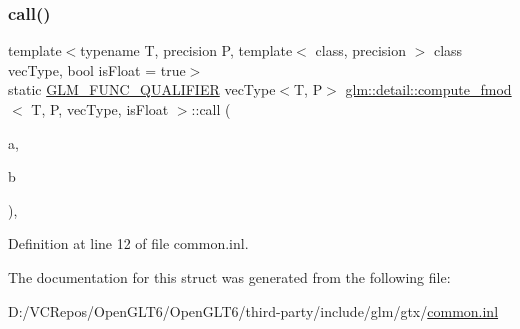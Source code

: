 \subsubsection{\texorpdfstring{call()}{call()}}
{\footnotesize\ttfamily template$<$typename T, precision P, template$<$ class, precision $>$ class vec\+Type, bool is\+Float = true$>$ \\
static \mbox{\hyperlink{setup_8hpp_a33fdea6f91c5f834105f7415e2a64407}{G\+L\+M\+\_\+\+F\+U\+N\+C\+\_\+\+Q\+U\+A\+L\+I\+F\+I\+ER}} vec\+Type$<$T, P$>$ \mbox{\hyperlink{structglm_1_1detail_1_1compute__fmod}{glm\+::detail\+::compute\+\_\+fmod}}$<$ T, P, vec\+Type, is\+Float $>$\+::call (\begin{DoxyParamCaption}\item[{vec\+Type$<$ T, P $>$ const \&}]{a,  }\item[{vec\+Type$<$ T, P $>$ const \&}]{b }\end{DoxyParamCaption})\hspace{0.3cm}{\ttfamily [inline]}, {\ttfamily [static]}}



Definition at line 12 of file common.\+inl.



The documentation for this struct was generated from the following file\+:\begin{DoxyCompactItemize}
\item 
D\+:/\+V\+C\+Repos/\+Open\+G\+L\+T6/\+Open\+G\+L\+T6/third-\/party/include/glm/gtx/\mbox{\hyperlink{common_8inl}{common.\+inl}}\end{DoxyCompactItemize}
